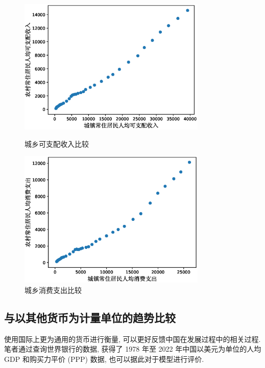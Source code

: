 \documentclass{article}
\begin{document}
\begin{figure}[H]
  \centering
  \begin{minipage}[t]{0.48\textwidth}
    \centering
    \includegraphics[width=0.8\textwidth]{figures/comparison3.eps}
    \caption{城乡可支配收入比较}
    \label{fig:side:g}
  \end{minipage}
  \begin{minipage}[t]{0.48\textwidth}
    \centering
    \includegraphics[width=0.8\textwidth]{figures/comparison4.eps}
    \caption{城乡消费支出比较}
    \label{fig:side:h}
  \end{minipage}
\end{figure}

\subsection{与以其他货币为计量单位的趋势比较}

\par 使用国际上更为通用的货币进行衡量, 可以更好反馈中国在发展过程中的相关过程. 笔者通过查询世界银行的数据, 获得了 1978 年至 2022 年中国以美元为单位的人均 GDP 和购买力平价 (PPP) 数据, 也可以据此对于模型进行评价.
\end{document}

